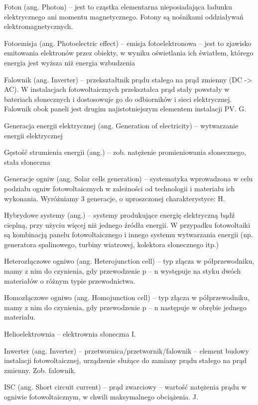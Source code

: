 \documentclass[12pt,a4paper]{article}
\begin{document}
Foton (ang. Photon) – jest to cząstka elementarna nieposiadająca ładunku elektrycznego ani momentu magnetycznego. Fotony są nośnikami oddziaływań elektromagnetycznych.

Fotoemisja (ang. Photoelectric effect) – emisja fotoelektronowa – jest to zjawisko emitowania elektronów przez obiekty, w wyniku oświetlania ich światłem, którego energia jest wyższa niż energia wzbudzenia

Falownik (ang. Inverter) – przekształtnik prądu stałego na prąd zmienny (DC -> AC). W instalacjach fotowoltaicznych przekształca prąd stały powstały w bateriach słonecznych i dostosowuje go do odbiorników i sieci elektrycznej. Falownik obok paneli jest drugim najistotniejszym elementem instalacji PV.
G.

Generacja energii elektrycznej (ang. Generation of electricity) – wytwarzanie energii elektrycznej

Gęstość strumienia energii (ang.) – zob. natężenie promieniowania słonecznego, stała słoneczna

Generacje ogniw (ang. Solar cells generation) – systematyka wprowadzona w celu podziału ogniw fotowoltaicznych w zależności od technologii i materiału ich  wykonania. Wyróżniamy 3 generacje, o uproszczonej charakterystyce:
H.

Hybrydowe systemy (ang.) – systemy produkujące energię elektryczną bądź cieplną, przy użyciu więcej niż jednego źródła energii. W przypadku fotowoltaiki są kombinacją panelu fotowoltaicznego i innego systemu wytwarzania energii (np. generatora spalinowego, turbiny wiatrowej, kolektora słonecznego itp.)

Heterozłączowe ogniwo (ang. Heterojunction cell) – typ złącza w półprzewodniku, mamy z nim do czynienia, gdy przewodzenie p – n występuje na styku dwóch materiałów o różnym typie przewodnictwa.

Homozłączowe ogniwo (ang. Homojunction cell) – typ złącza w półprzewodniku, mamy z nim do czynienia, gdy przewodzenie p – n następuje w obrębie jednego materiału.

Helioelektrownia – elektrownia słoneczna
I.

Inwerter (ang. Inverter) – przetwornica/przetwornik/falownik – element budowy instalacji fotowoltaicznej, urządzenie służące do zamiany prądu stałego na prąd zmienny. Zob. falownik.

ISC (ang. Short circuit current) – prąd zwarciowy – wartość natężenia prądu w ogniwie fotowoltaicznym, w chwili maksymalnego obciążenia.
J.
\end{document}
